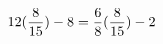 \documentclass[preview]{standalone}
\begin{document}
\begin{align*}
\special{dvisvgm:raw <g id='unique000'>}12(\frac{8}{15}) - 8 = \frac{6}{8} (\frac{8}{15}) - 2\special{dvisvgm:raw </g>}
\end{align*}
\end{document}
